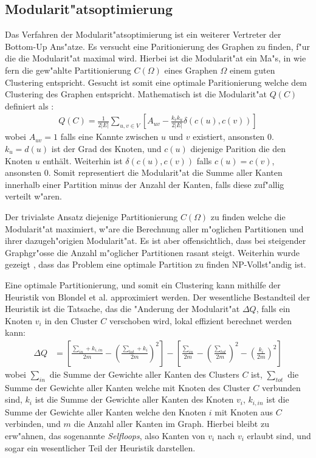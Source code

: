 \documentclass[journal]{vgtc}
\begin{document}
  \subsection{Modularit"atsoptimierung}
    \label{sec:modularity}
    Das Verfahren der Modularit"atsoptimierung ist ein weiterer Vertreter der Bottom-Up Ans"atze. Es versucht eine Paritionierung
    des Graphen zu finden, f"ur die die Modularit"at maximal wird. Hierbei ist die Modularit"at ein Ma"s, in wie fern die gew"ahlte
    Partitionierung $C(\Omega)$ eines Graphen $\Omega$ einem guten Clustering entspricht. Gesucht ist somit eine optimale Paritionierung welche dem Clustering des Graphen entspricht.
    Mathematisch ist die Modularit"at $Q(C)$ definiert als \cite{modularity}:
    \begin{align}
      Q(C)=\frac{1}{2|E|}\sum\limits_{u,v \in V}\left[ A_{uv} - \frac {k_vk_u}{2|E|}\delta \left( c(u), c(v)\right) \right]
    \end{align}
    wobei $A_{uv}=1$ falls eine Kannte zwischen $u$ und $v$ existiert, ansonsten 0. $k_u = d(u)$ ist der Grad des Knoten, und
    $c(u)$ diejenige Parition die den Knoten $u$ enthält. Weiterhin ist $\delta \left(c(u),c(v)\right)$ falls $c(u)=c(v)$,
    ansonsten 0.
    Somit representiert die Modularit"at die Summe aller Kanten innerhalb einer Partition minus der Anzahl der Kanten, falls diese 
    zuf"allig verteilt w"aren.
    
    Der trivialste Ansatz diejenige Partitionierung $C(\Omega)$ zu finden welche die Modularit"at maximiert, w"are die Berechnung
    aller m"oglichen Partitionen und ihrer dazugeh"origien Modularit"at. Es ist aber offensichtlich, dass bei steigender 
    Graphgr"osse die Anzahl m"oglicher Partitionen rasant steigt. Weiterhin wurde gezeigt \cite{modularity_nphard}, dass das Problem
    eine optimale Partition zu finden NP-Vollst"andig ist.
    
    Eine optimale Partitionierung, und somit ein Clustering kann mithilfe der Heuristik von Blondel et al. \cite{modularity_heuristic}
    approximiert werden. Der wesentliche Bestandteil
    der Heuristik ist die Tatsache, das die "Anderung der Modularit"at $\Delta Q$, falls ein Knoten $v_i$ in den Cluster $C$ verschoben
    wird, lokal effizient berechnet werden kann:
    \begin{align}
     \Delta Q &= \left[ \frac{\sum_{in}+k_{i,in}}{2m} - \left( \frac{\sum_{tot}+k_i}{2m} \right)^2 \right] -
     \left[ \frac{\sum_{in}}{2m} - \left( \frac{\sum_{tot}}{2m} \right)^2 - \left( \frac{k_i}{2m} \right)^2 \right]
    \end{align}
    wobei $\sum_{in}$ die Summe der Gewichte aller Kanten des Clusters $C$ ist, $\sum_{tot}$ die Summe der Gewichte aller Kanten welche
    mit Knoten des Cluster $C$ verbunden sind, $k_i$ ist die Summe der Gewichte aller Kanten des Knoten $v_i$, $k_{i,in}$ ist die
    Summe der Gewichte aller Kanten welche den Knoten $i$ mit Knoten aus $C$ verbinden, und $m$ die Anzahl aller Kanten im Graph.
    Hierbei bleibt zu erw"ahnen, das sogenannte \emph{Selfloops}, also Kanten von $v_i$ nach $v_i$ erlaubt sind, und sogar
    ein wesentlicher Teil der Heuristik darstellen.
    
\end{document}
